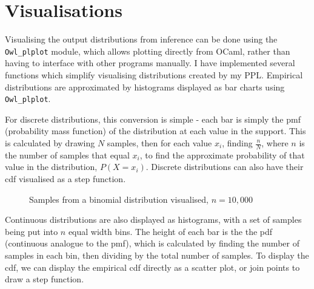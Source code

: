 \section{Visualisations}
Visualising the output distributions from inference can be done using the \texttt{Owl\_plplot} module, which allows plotting directly from OCaml, rather than having to interface with other programs manually. I have implemented several functions which simplify visualising distributions created by my PPL. Empirical distributions are approximated by histograms displayed as bar charts using \texttt{Owl\_plplot}.
	
For discrete distributions, this conversion is simple - each bar is simply the pmf (probability mass function) of the distribution at each value in the support. This is calculated by drawing $N$ samples, then for each value $x_i$, finding $\frac{n}{N}$, where $n$ is the number of samples that equal $x_i$, to find the approximate probability of that value in the distribution, $P(X = x_i)$. Discrete distributions can also have their cdf visualised as a step function.

\begin{figure}[!htb]
	\centering
	\qquad
	\caption{Samples from a binomial distribution visualised, $n=10,000$}
	\label{fig:vis-binom}
\end{figure}

Continuous distributions are also displayed as histograms, with a set of samples being put into $n$ equal width bins. The height of each bar is the the pdf (continuous analogue to the pmf), which is calculated by finding the number of samples in each bin, then dividing by the total number of samples. To display the cdf, we can display the empirical cdf directly as a scatter plot, or join points to draw a step function.
	
